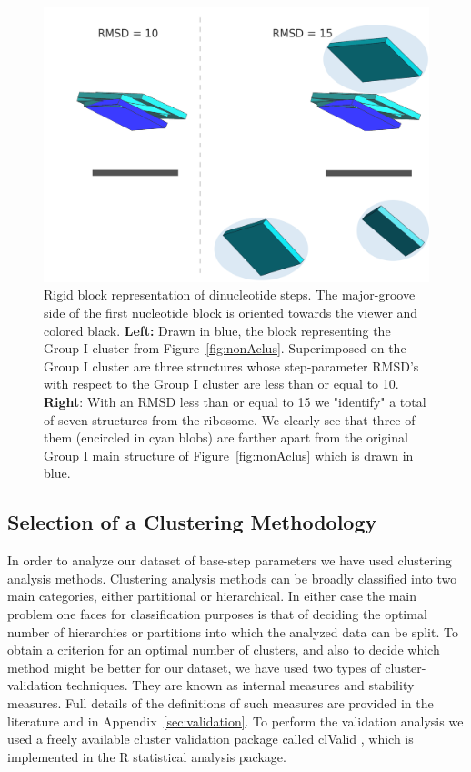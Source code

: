 \begin{figure}[htp]
 \centering
\includegraphics[angle=0, scale=1.5]{Chapter2/G1at10_15b.png}
\caption{Rigid  block   representation  of  dinucleotide   steps.  The
  major-groove side of the  first nucleotide block is oriented towards
  the  viewer and  colored black.  \textbf{Left:} Drawn  in  blue, the
  block     representing     the      Group     I     cluster     from
  Figure~\ref{fig:nonAclus}. Superimposed  on the Group  I cluster are
  three  structures whose  step-parameter RMSD's  with respect  to the
  Group I cluster  are less than or equal  to 10. \textbf{Right}: With
  an RMSD  less than  or equal to  15 we  "identify" a total  of seven
  structures  from the  ribosome. We  clearly see  that three  of them
  (encircled in cyan blobs) are  farther apart from the original Group
  I  main structure  of  Figure~\ref{fig:nonAclus} which  is drawn  in
  blue.}
 \label{fig:superimpose}
\end{figure}

\subsection{Selection of a Clustering Methodology} In order to analyze
our dataset  of base-step parameters we have  used clustering analysis
methods.  Clustering  analysis methods can be  broadly classified into
two main  categories, either  partitional or hierarchical.   In either
case the main problem one faces for classification purposes is that of
deciding the  optimal number of  hierarchies or partitions  into which
the analyzed data can be split.   To obtain a criterion for an optimal
number of  clusters, and also to  decide which method  might be better
for  our  dataset,  we  have  used  two  types  of  cluster-validation
techniques.   They  are  known  as  internal  measures  and  stability
measures.   Full  details of  the  definitions  of  such measures  are
provided  in   the  literature  \cite{handl2005,   brock2008}  and  in
Appendix~\ref{sec:validation}.  To perform  the validation analysis we
used  a freely  available  cluster validation  package called  clValid
\cite{brock2008},   which  is  implemented   in  the   R  \cite{rcite}
statistical analysis package.

